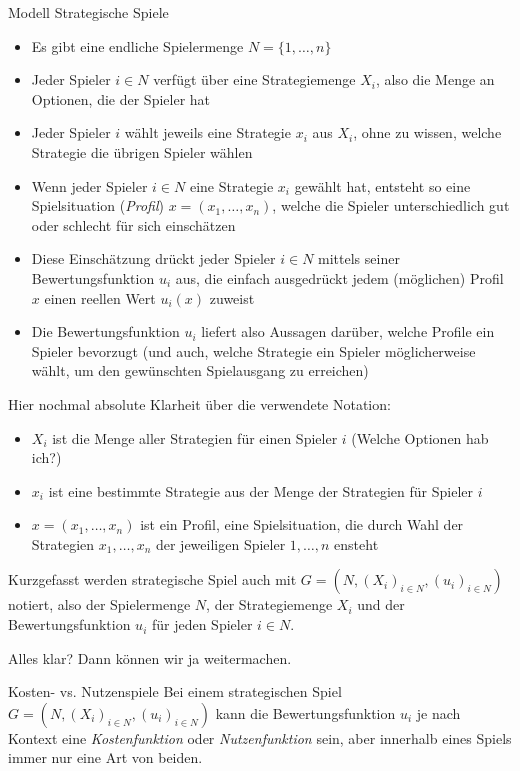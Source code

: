 \documentclass{panikzettel}
\begin{document}
{\begin{defi}{Modell Strategische Spiele}
	\begin{itemize}
		\item Es gibt eine endliche Spielermenge $N = \{1, \dots, n \}$
		\item Jeder Spieler $i \in N$ verfügt über eine Strategiemenge $X_i$, also die Menge an Optionen, die der Spieler hat
		\item Jeder Spieler $i$ wählt jeweils eine Strategie $x_i$ aus $X_i$, ohne zu wissen, welche Strategie die übrigen Spieler wählen
		\item Wenn jeder Spieler $i \in N$ eine Strategie $x_i$ gewählt hat, entsteht so eine Spielsituation (\emph{Profil}) $ x = (x_1, \dots , x_n)$, welche die Spieler unterschiedlich gut oder schlecht für sich einschätzen
		\item Diese Einschätzung drückt jeder Spieler $i \in N$ mittels seiner Bewertungsfunktion $u_i$ aus, die einfach ausgedrückt jedem (möglichen) Profil $x$ einen reellen Wert $u_i(x)$ zuweist 
		\item Die Bewertungsfunktion $u_i$ liefert also Aussagen darüber, welche Profile ein Spieler bevorzugt (und auch, welche Strategie ein Spieler möglicherweise wählt, um den gewünschten Spielausgang zu erreichen)
	\end{itemize}
\end{defi}

Hier nochmal absolute Klarheit über die verwendete Notation: 
\begin{itemize}
	\item $X_i$ ist die Menge aller Strategien für einen Spieler $i$ (Welche Optionen hab ich?)
	\item $x_i$ ist eine bestimmte Strategie aus der Menge der Strategien für Spieler $i$ 
	\item $x = (x_1, \dots , x_n)$ ist ein Profil, eine Spielsituation, die durch Wahl der Strategien $x_1, \dots, x_n$ der jeweiligen Spieler $1, \dots, n$ ensteht
\end{itemize}

Kurzgefasst werden strategische Spiel auch mit $G = (N, (X_i)_{i \in N}, (u_i)_{i \in N} )$ notiert, also der Spielermenge $N$, der Strategiemenge $X_i$ und der Bewertungsfunktion $u_i$ für jeden Spieler $i \in N$. 

Alles klar? Dann können wir ja weitermachen.

\begin{defi}{Kosten- vs. Nutzenspiele}
	Bei einem strategischen Spiel $G = (N, (X_i)_{i \in N}, (u_i)_{i \in N} )$ kann die Bewertungsfunktion $u_i$ je nach Kontext eine \emph{Kostenfunktion} oder \emph{Nutzenfunktion} sein, aber innerhalb eines Spiels immer nur eine Art von beiden.
	

\end{defi}}
\end{document}
